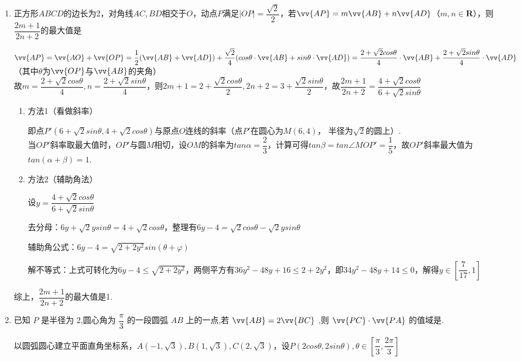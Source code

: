 \begin{enumerate}
\begin{jieda}
        又因为$P(cos\alpha. sin\alpha)$在以原点为圆心的单位圆在第一象限的圆弧上，因此$|\vv{OC'}| \geq \dfrac{2}{3}$，即$|\vv{c}| \geq \dfrac{1}{3}$
    \end{jieda}
    \item 正方形$ABCD$的边长为2，对角线$AC, BD$相交于$O$，动点$P$满足$|OP| = \dfrac{\sqrt{2}}{2}$，若$\vv{AP} = m \vv{AB} + n \vv{AD}$（$m, n \in \mathbf{R}$），则$\dfrac{2m+1}{2n+2}$的最大值是
        \begin{jieda}
            $\vv{AP} = \vv{AO} + \vv{OP} = \dfrac{1}{2}(\vv{AB} + \vv{AD}) + \dfrac{\sqrt{2}}{4}(cos\theta \cdot \vv{AB} + sin\theta \cdot \vv{AD}) = \dfrac{2+\sqrt{2}cos\theta}{4} \cdot \vv{AB} + \dfrac{2+\sqrt{2}sin\theta}{4} \cdot \vv{AD}$（其中$\theta$为$\vv{OP}$与$\vv{AB}$的夹角）\\
            故$m = \dfrac{2+\sqrt{2}cos\theta}{4}, n = \dfrac{2+\sqrt{2}sin\theta}{4}$，则$2m+1 = 2+\dfrac{\sqrt{2}cos\theta}{2}, 2n+2 = 3+\dfrac{\sqrt{2}sin\theta}{2}$，故$\dfrac{2m+1}{2n+2} = \dfrac{4+\sqrt{2}cos\theta}{6+\sqrt{2}sin\theta}$
            
            \begin{enumerate}
                \item 方法1（看做斜率）
                
                即点$P'(6+\sqrt{2}sin\theta, 4+\sqrt{2}cos\theta)$与原点$O$连线的斜率（点$P'$在圆心为$M(6, 4)$， 半径为$\sqrt{2}$的圆上）.\\
                当$OP'$斜率取最大值时，$OP'$与圆$M$相切，设$OM$的斜率为$tan\alpha = \dfrac{2}{3}$，计算可得$tan\beta = tan\angle MOP' = \dfrac{1}{5}$，故$OP'$斜率最大值为$tan(\alpha+\beta) = 1$.
                \item 方法2（辅助角法）
                
                设$y = \dfrac{4+\sqrt{2}cos\theta}{6+\sqrt{2}sin\theta}$
                
                去分母：$6y+\sqrt{2}ysin\theta = 4+\sqrt{2}cos\theta$，整理有$6y-4 = \sqrt{2}cos\theta - \sqrt{2}ysin\theta$
                
                辅助角公式：$6y-4 = \sqrt{2+2y^2}sin(\theta+\varphi)$
                
                解不等式：上式可转化为$6y-4 \leq \sqrt{2+2y^2}$，两侧平方有$36y^2-48y+16 \leq 2+2y^2$，即$34y^2-48y+14 \leq 0$，解得$y \in \left[\dfrac{7}{17}, 1\right]$
            \end{enumerate}
            综上，$\dfrac{2m+1}{2n+2}$的最大值是1.
        \end{jieda}
    \item 已知 $P$ 是半径为 2,圆心角为 $\dfrac{\pi }{3}$ 的一段圆弧 ${AB}$ 上的一点,若 $\vv{AB} = 2\vv{BC}$ ,则 $\vv{PC} \cdot  \vv{PA}$ 的值域是\blkda[3]{$[5-2\sqrt{13}, 0]$}.
    \begin{jieda}
        以圆弧圆心建立平面直角坐标系，$A(-1, \sqrt{3}), B(1, \sqrt{3}), C(2, \sqrt{3})$，设$P(2cos\theta, 2sin\theta), \theta \in \left[\dfrac{\pi}{3}, \dfrac{2\pi}{3}\right]$


\end{jieda}
\end{enumerate}
